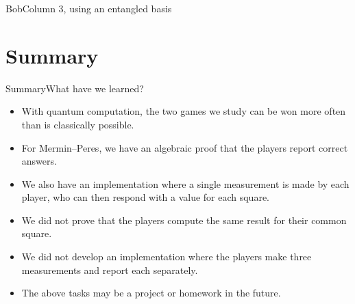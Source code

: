 \begin{frame}{Bob}{Column 3, using an entangled basis}
    
\end{frame}

\section*{Summary}

\begin{frame}{Summary}{What have we learned?}
\begin{itemize}[<+->]
    \item With quantum computation, the two games we study can be won more often than is classically possible.
    \item For Mermin--Peres, we have an algebraic proof that the players report correct answers.
    \item We also have an implementation where a single measurement is made by each player, who can then respond with a value for each square.
    \item We did not prove that the players compute the same result for their common square.
    \item We did not develop an implementation where the players make three measurements and report each separately.
    \item The above tasks may be a project or homework in the future.
\end{itemize}
\end{frame}
